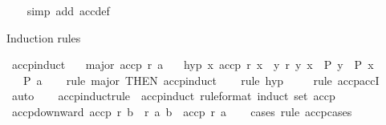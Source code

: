 \begin{isabellebody}
%
\isadelimproof
\ \ %
\endisadelimproof
%
\isatagproof
{}\isamarkupfalse%
\ {\isacharparenleft}{\kern0pt}simp\ add{\isacharcolon}{\kern0pt}\ acc{\isacharunderscore}{\kern0pt}def{\isacharparenright}{\kern0pt}%
\endisatagproof
{\isafoldproof}%
%
\isadelimproof
%
\endisadelimproof
%
\begin{isamarkuptext}%
Induction rules%
\end{isamarkuptext}\isamarkuptrue%
\isamarkupfalse%
\ accp{\isacharunderscore}{\kern0pt}induct{\isacharcolon}{\kern0pt}\isanewline
\ \ \ major{\isacharcolon}{\kern0pt}\ {\isachardoublequoteopen}accp\ r\ a{\isachardoublequoteclose}\isanewline
\ \ \ hyp{\isacharcolon}{\kern0pt}\ {\isachardoublequoteopen}{\isasymAnd}x{\isachardot}{\kern0pt}\ accp\ r\ x\ {\isasymLongrightarrow}\ {\isasymforall}y{\isachardot}{\kern0pt}\ r\ y\ x\ {\isasymlongrightarrow}\ P\ y\ {\isasymLongrightarrow}\ P\ x{\isachardoublequoteclose}\isanewline
\ \ \ {\isachardoublequoteopen}P\ a{\isachardoublequoteclose}\isanewline
%
\isadelimproof
\ \ %
\endisadelimproof
%
\isatagproof
{}\isamarkupfalse%
\ {\isacharparenleft}{\kern0pt}rule\ major\ {\isacharbrackleft}{\kern0pt}THEN\ accp{\isachardot}{\kern0pt}induct{\isacharbrackright}{\kern0pt}{\isacharparenright}{\kern0pt}\isanewline
\ \ \isamarkupfalse%
\ {\isacharparenleft}{\kern0pt}rule\ hyp{\isacharparenright}{\kern0pt}\isanewline
\ \ \ \isamarkupfalse%
\ {\isacharparenleft}{\kern0pt}rule\ accp{\isachardot}{\kern0pt}accI{\isacharparenright}{\kern0pt}\isanewline
\ \ \ \isamarkupfalse%
\ auto\isanewline
\ \ \isamarkupfalse%
%
\endisatagproof
{\isafoldproof}%
%
\isadelimproof
\isanewline
%
\endisadelimproof
\isanewline
{}\isamarkupfalse%
\ accp{\isacharunderscore}{\kern0pt}induct{\isacharunderscore}{\kern0pt}rule\ {\isacharequal}{\kern0pt}\ accp{\isacharunderscore}{\kern0pt}induct\ {\isacharbrackleft}{\kern0pt}rule{\isacharunderscore}{\kern0pt}format{\isacharcomma}{\kern0pt}\ induct\ set{\isacharcolon}{\kern0pt}\ accp{\isacharbrackright}{\kern0pt}\isanewline
\isanewline
{}\isamarkupfalse%
\ accp{\isacharunderscore}{\kern0pt}downward{\isacharcolon}{\kern0pt}\ {\isachardoublequoteopen}accp\ r\ b\ {\isasymLongrightarrow}\ r\ a\ b\ {\isasymLongrightarrow}\ accp\ r\ a{\isachardoublequoteclose}\isanewline
%
\isadelimproof
\ \ %
\endisadelimproof
%
\isatagproof
{}\isamarkupfalse%
\ {\isacharparenleft}{\kern0pt}cases\ rule{\isacharcolon}{\kern0pt}\ accp{\isachardot}{\kern0pt}cases{\isacharparenright}{\kern0pt}%

\end{isabellebody}
